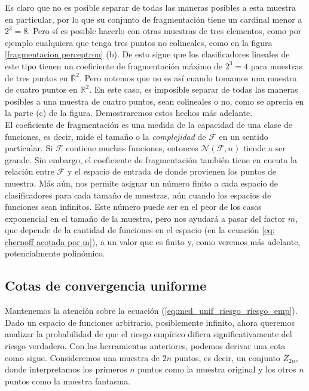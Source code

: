 \documentclass{article}
\begin{document}
Es claro que no es posible separar de todas las maneras posibles a esta muestra en particular, por lo que su conjunto de fragmentación
tiene un cardinal menor a $2^3=8$. Pero sí es posible hacerlo con otras muestras de tres elementos, como por ejemplo cualquiera que tenga 
tres puntos no colineales, como en la figura \ref{fragmentacion perceptron} (b). De esto sigue
que los clasificadores lineales de este tipo tienen un coeficiente de fragmentación máximo de $2^3=4$ para muestras de tres puntos en $\mathbb{R}^2$.
Pero notemos que no es así cuando tomamos una muestra de cuatro puntos en $\mathbb{R}^2$. En este caso, es imposible separar de todas las maneras posibles
a una muestra de cuatro puntos, sean colineales o no, como se aprecia en la parte (c) de la figura. Demostraremos estos hechos más adelante.
\\

El coeficiente de fragmentación es una medida de la capacidad de una clase de funciones, es decir, mide 
el tamaño o la \textit{complejidad} de \(\mathcal{F}\) en un sentido particular. Si \(\mathcal{F}\) contiene muchas funciones, entonces 
$\mathcal{N}(\mathcal{F}, n)$ tiende a ser grande. Sin embargo, el coeficiente de fragmentación también tiene en cuenta 
la relación entre \(\mathcal{F}\) y el espacio de entrada de donde provienen los puntos de muestra. Más aún, nos permite asignar un número
finito a cada espacio de clasificadores para cada tamaño de muestras, aún cuando los espacios de funciones sean infinitos. Este número puede
ser en el peor de los casos exponencial en el tamaño de la muestra, pero nos ayudará a pasar del factor $m$, que depende de la cantidad
de funciones en el espacio (en la ecuación \ref{eq: chernoff acotada por m}), a un valor que es finito y, como veremos más adelante,
potencialmente polinómico.

\subsection{Cotas de convergencia uniforme}

Mantenemos la atención sobre la ecuación (\ref{eq:med_unif_riesgo_riesgo_emp}). Dado un espacio de funciones arbitrario, 
posiblemente infinito, ahora queremos analizar la probabilidad 
de que el riesgo empírico difiera significativamente del riesgo verdadero. Con las herramientas anteriores, 
podemos derivar una cota como sigue. Consideremos una muestra de \(2n\) puntos, es decir, un conjunto 
\(Z_{2n}\), donde interpretamos los primeros \(n\) puntos como la muestra original y los otros \(n\) 
puntos como la muestra fantasma.\\
\end{document}
